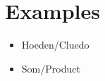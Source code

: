 \section{Examples}
\label{sec:example}

\begin{itemize}
\item{Hoeden/Cluedo}
\item{Som/Product}
\end{itemize}
